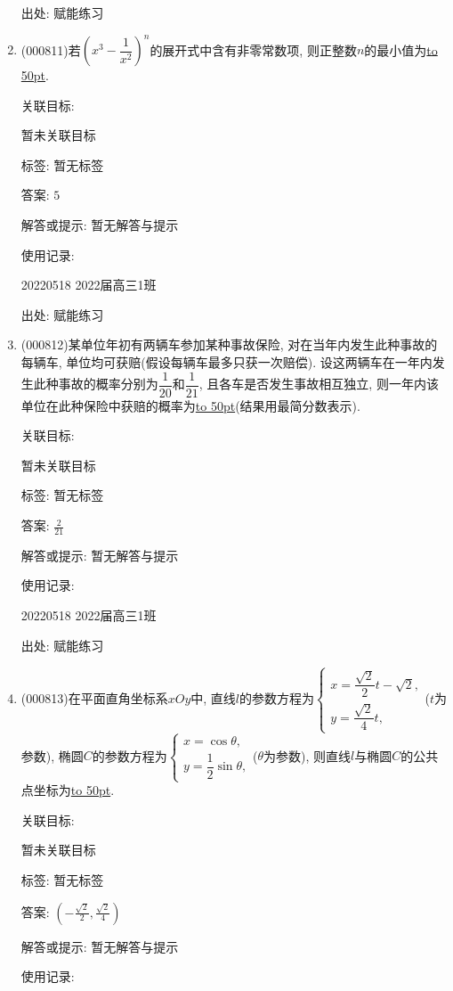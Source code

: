 \documentclass[10pt,a4paper]{article}
\newcommand{\blank}[1]{\underline{\hbox to #1pt{}}}
\begin{document}
\begin{enumerate}[1.]
出处: 赋能练习
\item { (000811)}若$(x^3-\dfrac1{x^2})^n$的展开式中含有非零常数项, 则正整数$n$的最小值为\blank{50}.


关联目标:

暂未关联目标



标签: 暂无标签

答案: $5$

解答或提示: 暂无解答与提示

使用记录:

20220518	2022届高三1班	


出处: 赋能练习
\item { (000812)}某单位年初有两辆车参加某种事故保险, 对在当年内发生此种事故的每辆车, 单位均可获赔(假设每辆车最多只获一次赔偿). 设这两辆车在一年内发生此种事故的概率分别为$\dfrac1{20}$和$\dfrac1{21}$, 且各车是否发生事故相互独立, 则一年内该单位在此种保险中获赔的概率为\blank{50}(结果用最简分数表示).


关联目标:

暂未关联目标



标签: 暂无标签

答案: $\frac 2{21}$

解答或提示: 暂无解答与提示

使用记录:

20220518	2022届高三1班	


出处: 赋能练习
\item { (000813)}在平面直角坐标系$xOy$中, 直线$l$的参数方程为$\begin{cases} x=\dfrac{\sqrt2}2t-\sqrt2, \\ y=\dfrac{\sqrt2}4t, \end{cases}$($t$为参数), 椭圆$C$的参数方程为$\begin{cases} x=\cos \theta,  \\ y=\dfrac12\sin \theta,  \end{cases}$($\theta$为参数), 则直线$l$与椭圆$C$的公共点坐标为\blank{50}.


关联目标:

暂未关联目标



标签: 暂无标签

答案: $(-\frac{\sqrt 2}2,\frac{\sqrt 2}4)$

解答或提示: 暂无解答与提示

使用记录:


\end{enumerate}
\end{document}
